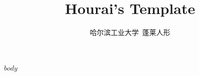 \documentclass{ctexart}
\title{Hourai's Template}
\author{哈尔滨工业大学\ 蓬莱人形}
\begin{document}
    \maketitle

    \tableofcontents
    
    \newpage

$body$
\end{document}
